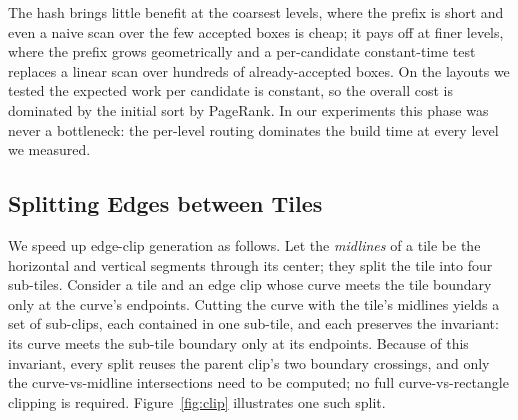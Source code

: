 \documentclass[a4paper,USenglish,anonymous]{gd-lipics-v3}
\begin{document}
The hash brings little benefit at the coarsest levels, where the
prefix is short and even a naive scan over the few accepted boxes is
cheap; it pays off at finer levels, where the prefix grows
geometrically and a per-candidate constant-time test replaces a linear
scan over hundreds of already-accepted boxes.  On the layouts we
tested the expected work per candidate is constant, so the overall
cost is dominated by the initial sort by PageRank.  In our experiments
this phase was never a bottleneck: the per-level routing dominates
the build time at every level we measured.


\subsection{Splitting Edges between Tiles}
\label{sec:tile-build}
We speed up edge-clip generation as follows. Let the \emph{midlines}
of a tile be the horizontal and vertical segments through its
center; they split the tile into four sub-tiles. Consider a tile and
an edge clip whose curve meets the tile boundary only at the curve's
endpoints. Cutting the curve with the tile's midlines yields a set
of sub-clips, each contained in one sub-tile, and each preserves the
invariant: its curve meets the sub-tile boundary only at its
endpoints. Because of this invariant, every split reuses the parent
clip's two boundary crossings, and only the curve-vs-midline
intersections need to be computed; no full curve-vs-rectangle
clipping is required. Figure~\ref{fig:clip} illustrates one such
split.
\end{document}
